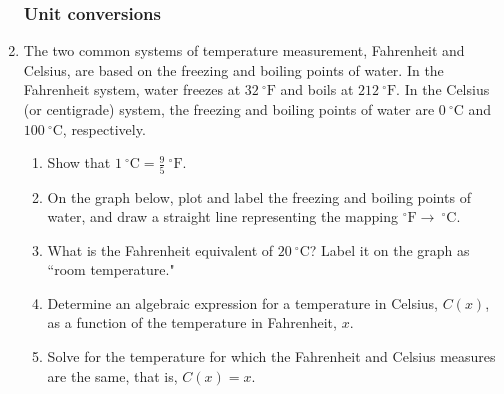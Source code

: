 \documentclass[12pt, oneside]{article}
\begin{document}
\begin{enumerate}
\subsubsection*{Unit conversions}

\item The two common systems of temperature measurement, Fahrenheit and Celsius, are based on the freezing and boiling points of water. In the Fahrenheit system, water freezes at $32 \ ^\circ\text{F}$ and boils at $212 \ ^\circ\text{F}$. In the Celsius (or centigrade) system, the freezing and boiling points of water are $0 \ ^\circ \text{C}$ and $100 \ ^\circ \text{C}$, respectively.
\begin{enumerate}
    \item Show that $\displaystyle 1 \ ^\circ \text{C} = \frac{9}{5} \ ^\circ \text{F}$.
    \item On the graph below, plot and label the freezing and boiling points of water, and draw a straight line representing the mapping $^\circ \text{F}\to \ ^\circ \text{C}$.
    \item What is the Fahrenheit equivalent of $20 \ ^\circ \text{C}$? Label it on the graph as ``room temperature."
    \item Determine an algebraic expression for a temperature in Celsius, $C(x)$, as a function of the temperature in Fahrenheit, $x$.
    \item Solve for the temperature for which the Fahrenheit and Celsius measures are the same, that is, $C(x)=x$.
\end{enumerate}

\end{enumerate}
\end{document}
